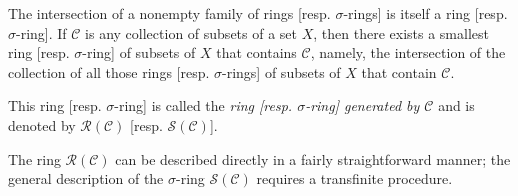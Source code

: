 The intersection of a nonempty family of rings [resp. $\sigma$-rings] is itself a ring [resp. $\sigma$-ring]. If $\mathcal{C}$ is any collection of subsets of a set $X$, then there exists a smallest ring [resp. $\sigma$-ring] of subsets of $X$ that contains $\mathcal{C}$, namely, the intersection of the collection of all those rings [resp. $\sigma$-rings] of subsets of $X$ that contain $\mathcal{C}$.

This ring [resp. $\sigma$-ring] is called the \textit{ring [resp. $\sigma$-ring] generated by $\mathcal{C}$} and is denoted by $\mathcal{R}(\mathcal{C})$ [resp. $\mathcal{S}(\mathcal{C})$].

The ring $\mathcal{R}(\mathcal{C})$ can be described directly in a fairly straightforward manner; the general description of the $\sigma$-ring $\mathcal{S}(\mathcal{C})$ requires a transfinite procedure.
